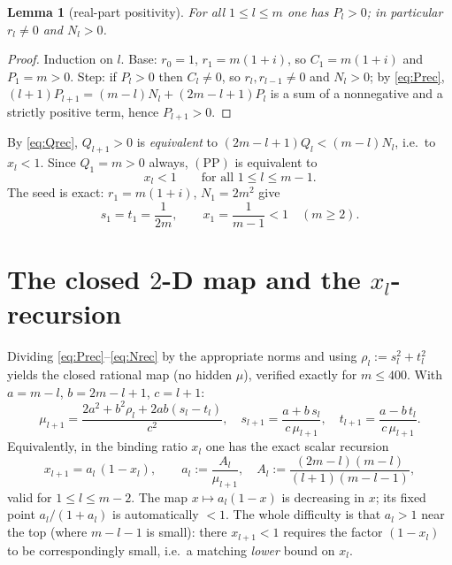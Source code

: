 \documentclass[11pt]{article}
\newtheorem{lemma}{Lemma}
\theoremstyle{definition}
\begin{document}
\begin{lemma}[real-part positivity]\label{lem:Ppos}
For all $1\le l\le m$ one has $P_l>0$; in particular $r_l\neq0$ and
$N_l>0$.
\end{lemma}
\begin{proof}
Induction on $l$.  Base: $r_0=1$, $r_1=m(1+i)$, so $C_1=m(1+i)$ and
$P_1=m>0$.  Step: if $P_l>0$ then $C_l\neq0$, so $r_l,r_{l-1}\neq0$ and
$N_l>0$; by \eqref{eq:Prec}, $(l+1)P_{l+1}=(m-l)N_l+(2m-l+1)P_l$ is a sum
of a nonnegative and a strictly positive term, hence $P_{l+1}>0$.
\end{proof}

By \eqref{eq:Qrec}, $Q_{l+1}>0$ is \emph{equivalent} to
$(2m-l+1)Q_l<(m-l)N_l$, i.e.\ to $x_l<1$.  Since $Q_1=m>0$ always,
$(\mathrm{PP})$ is equivalent to
\begin{equation}\label{eq:target}
  x_l<1\qquad\text{for all }1\le l\le m-1 .
\end{equation}
The seed is exact: $r_1=m(1+i)$, $N_1=2m^2$ give
\begin{equation}\label{eq:seed}
  s_1=t_1=\frac1{2m},\qquad x_1=\frac1{m-1}<1\quad(m\ge2).
\end{equation}

\section{The closed $2$-D map and the $x_l$-recursion}\label{sec:map}

Dividing \eqref{eq:Prec}--\eqref{eq:Nrec} by the appropriate norms and
using $\rho_l:=s_l^2+t_l^2$ yields the closed rational map (no hidden
$\mu$), verified exactly for $m\le400$.  With $a=m-l$, $b=2m-l+1$,
$c=l+1$:
\begin{equation}\label{eq:stmap}
  \mu_{l+1}=\frac{2a^2+b^2\rho_l+2ab(s_l-t_l)}{c^2},\quad
  s_{l+1}=\frac{a+b\,s_l}{c\,\mu_{l+1}},\quad
  t_{l+1}=\frac{a-b\,t_l}{c\,\mu_{l+1}} .
\end{equation}
Equivalently, in the binding ratio $x_l$ one has the exact scalar
recursion
\begin{equation}\label{eq:xrec}
  x_{l+1}=a_l\,(1-x_l),\qquad a_l:=\frac{A_l}{\mu_{l+1}},\quad
  A_l:=\frac{(2m-l)(m-l)}{(l+1)(m-l-1)} ,
\end{equation}
valid for $1\le l\le m-2$.  The map $x\mapsto a_l(1-x)$ is decreasing in
$x$; its fixed point $a_l/(1+a_l)$ is automatically $<1$.  The whole
difficulty is that $a_l>1$ near the top (where $m-l-1$ is small): there
$x_{l+1}<1$ requires the factor $(1-x_l)$ to be correspondingly small,
i.e.\ a matching \emph{lower} bound on $x_l$.
\end{document}
